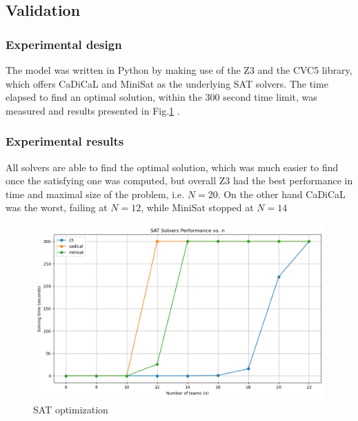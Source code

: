 \subsection{Validation}
\subsubsection{Experimental design}
The model was written in Python by making use of the Z3 and the CVC5 library, which offers CaDiCaL and MiniSat as the underlying SAT solvers. The time elapsed to find an optimal solution, within the 300 second time limit, was measured and results presented in Fig.\ref{fig:SAT-result} . 
\subsubsection{Experimental results}
All solvers are able to find the optimal solution, which was much easier to find once the satisfying one was computed, but overall Z3 had the best performance in time and maximal size of the problem, i.e. $N=20$. On the other hand CaDiCaL was the worst, failing at $N=12$, while MiniSat stopped at $N=14$
\begin{figure}
    \centering
    \includegraphics[width=0.8\linewidth]{img/SAT-result.png}
    \caption{SAT optimization}
    \label{fig:SAT-result}
\end{figure}